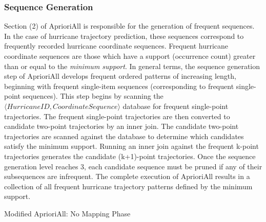 \documentclass[12pt,conference]{IEEEtran}
\begin{document}
\subsubsection{Sequence Generation}

Section (2) of AprioriAll is responsible for the generation of frequent sequences. In the case of hurricane trajectory prediction, these sequences correspond to frequently recorded hurricane coordinate sequences. Frequent hurricane coordinate sequences are those which have a support (occurrence count) greater than or equal to the \textit{minimum support}. In general terms, the sequence generation step of AprioriAll develops frequent ordered patterns of increasing length, beginning with frequent single-item sequences (corresponding to frequent single-point sequences). This step begins by scanning the $\langle HurricaneID, CoordinateSequence\rangle$ database for frequent single-point trajectories. The frequent single-point trajectories are then converted to candidate two-point trajectories by an inner join. The candidate two-point trajectories are scanned against the database to determine which candidates satisfy the minimum support. Running an inner join against the frequent k-point trajectories generates the candidate (k+1)-point trajectories. Once the sequence generation level reaches 3, each candidate sequence must be pruned if any of their subsequences are infrequent. The complete execution of AprioriAll results in a collection of all frequent hurricane trajectory patterns defined by the minimum support.

\begin{algorithm}[H]
  \caption{Modified AprioriAll: No Mapping Phase}
  \label{aprioriall_for_hurricanes}
  \begin{algorithmic}[1]
    \EndFor
  \EndFor
  \end{algorithmic}
\end{algorithm}
\end{document}
